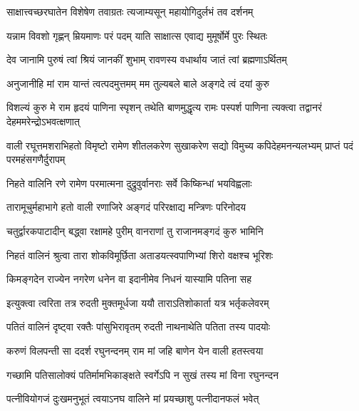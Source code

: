 \twolineshloka
{साक्षात्त्वच्छरघातेन विशेषेण तवाग्रतः}
{त्यजाम्यसून् महायोगिदुर्लभं तव दर्शनम्} %

\twolineshloka
{यन्नाम विवशो गृह्णन् म्रियमाणः परं पदम्}
{याति साक्षात्स एवाद्य मुमूर्षोर्मे पुरः स्थितः} %

\twolineshloka
{देव जानामि पुरुषं त्वां श्रियं जानकीं शुभाम्}
{रावणस्य वधार्थाय जातं त्वां ब्रह्मणाऽर्थितम्} %

\twolineshloka
{अनुजानीहि मां राम यान्तं त्वत्पदमुत्तमम्}
{मम तुल्यबले बाले अङ्गदे त्वं दयां कुरु} %

\threelineshloka
{विशल्यं कुरु मे राम हृदयं पाणिना स्पृशन्}
{तथेति बाणमुद्धृत्य रामः पस्पर्श पाणिना}
{त्यक्त्वा तद्वानरं देहममरेन्द्रोऽभवत्क्षणात्} %

\fourlineindentedshloka
{वाली रघूत्तमशराभिहतो विमृष्टो}
{रामेण शीतलकरेण सुखाकरेण}
{सद्यो विमुच्य कपिदेहमनन्यलभ्यम्}
{प्राप्तं पदं परमहंसगणैर्दुरापम्} %





\twolineshloka
{निहते वालिनि रणे रामेण परमात्मना}
{दुद्रुवुर्वानराः सर्वे किष्किन्धां भयविह्वलाः} %

\twolineshloka
{तारामूचुर्महाभागे हतो वाली रणाजिरे}
{अङ्गदं परिरक्षाद्य मन्त्रिणः परिनोदय} %

\twolineshloka
{चतुर्द्वारकपाटादीन् बद्ध्वा रक्षामहे पुरीम्}
{वानराणां तु राजानमङ्गदं कुरु भामिनि} %

\twolineshloka
{निहतं वालिनं श्रुत्वा तारा शोकविमूर्छिता}
{अताडयत्स्वपाणिभ्यां शिरो वक्षश्च भूरिशः} %

\twolineshloka
{किमङ्गदेन राज्येन नगरेण धनेन वा}
{इदानीमेव निधनं यास्यामि पतिना सह} %

\twolineshloka
{इत्युक्त्वा त्वरिता तत्र रुदती मुक्तमूर्धजा}
{ययौ ताराऽतिशोकार्ता यत्र भर्तृकलेवरम्} %

\twolineshloka
{पतितं वालिनं दृष्ट्वा रक्तैः पांसुभिरावृतम्}
{रुदती नाथनाथेति पतिता तस्य पादयोः} %

\twolineshloka
{करुणं विलपन्ती सा ददर्श रघुनन्दनम्}
{राम मां जहि बाणेन येन वाली हतस्त्वया} %

\twolineshloka
{गच्छामि पतिसालोक्यं पतिर्मामभिकाङ्क्षते}
{स्वर्गेऽपि न सुखं तस्य मां विना रघुनन्दन} %

\twolineshloka
{पत्नीवियोगजं दुःखमनुभूतं त्वयाऽनघ}
{वालिने मां प्रयच्छाशु पत्नीदानफलं भवेत्} %


